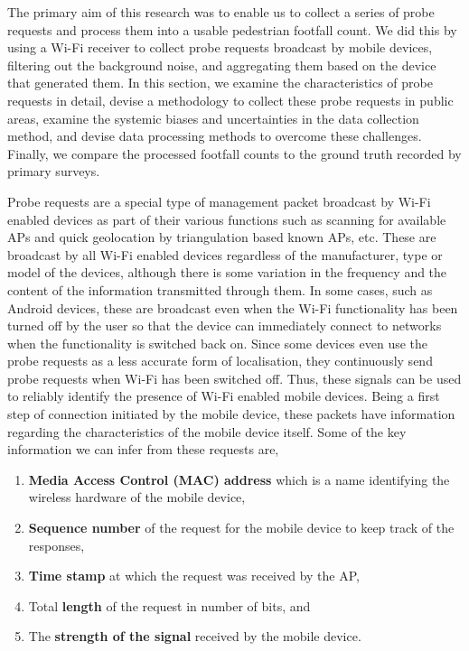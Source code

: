 The primary aim of this research was to enable us to collect a series of probe
requests and process them into a usable pedestrian footfall count. We did this
by using a Wi-Fi receiver to collect probe requests broadcast by mobile devices,
filtering out the background noise, and aggregating them based on the device
that generated them. In this section, we examine the characteristics of probe
requests in detail, devise a methodology to collect these probe requests in
public areas, examine the systemic biases and uncertainties in the data
collection method, and devise data processing methods to overcome these
challenges. Finally, we compare the processed footfall counts to the ground
truth recorded by primary surveys.

Probe requests are a special type of management packet broadcast by Wi-Fi
enabled devices as part of their various functions such as scanning for
available APs and quick geolocation by triangulation based known APs, etc.
These are broadcast by all Wi-Fi enabled devices regardless of the manufacturer,
type or model of the devices, although there is some variation in the frequency
and the content of the information transmitted through them. In some cases, such
as Android devices, these are broadcast even when the Wi-Fi functionality has
been turned off by the user so that the device can immediately connect to
networks when the functionality is switched back on. Since some devices even use
the probe requests as a less accurate form of localisation, they continuously
send probe requests when Wi-Fi has been switched off. Thus, these signals can be
used to reliably identify the presence of Wi-Fi enabled mobile devices. Being a
first step of connection initiated by the mobile device, these packets have
information regarding the characteristics of the mobile device itself. Some of
the key information we can infer from these requests are,

\begin{enumerate} 
\item \textbf{Media Access Control (MAC) address} which is a name identifying
	the wireless hardware of the mobile device, 
\item \textbf{Sequence number} of the request for the mobile device to keep
	track of the responses, 
\item \textbf{Time stamp} at which the request was received by the AP, 
\item Total \textbf{length} of the request in number of bits, and 
\item The \textbf{strength of the signal} received by the mobile device.
\end{enumerate}

